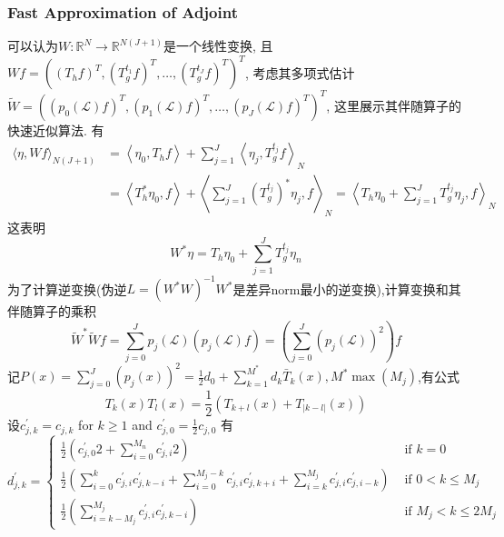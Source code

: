 \documentclass{article}
\begin{document}
\subsubsection{Fast Approximation of Adjoint}

    可以认为$W: \mathbb{R}^{N} \rightarrow \mathbb{R}^{N(J+1)}$是一个线性变换, 且$W f=\left(\left(T_{h} f\right)^{T},\left(T_{g}^{t_{1}} f\right)^{T}, \ldots,\left(T_{g}^{t_{J}} f\right)^{T}\right)^{T}$, 考虑其多项式估计$\tilde W=\left(\left(p_{0}(\mathcal{L}) f\right)^{T},\left(p_{1}(\mathcal{L}) f\right)^{T}, \ldots,\left(p_{J}(\mathcal{L}) f\right)^{T}\right)^{T}$, 这里展示其伴随算子的快速近似算法.
    有
    \begin{equation}
        \begin{aligned}
        \langle\eta, W f\rangle_{N(J+1)} &=\left\langle\eta_{0}, T_{h} f\right\rangle+\sum_{j=1}^{J}\left\langle\eta_{j}, T_{g}^{t_{j}} f\right\rangle_{N} \\
        &=\left\langle T_{h}^{*} \eta_{0}, f\right\rangle+\left\langle\sum_{j=1}^{J}\left(T_{g}^{t_{j}}\right)^{*} \eta_{j}, f\right\rangle_{N}=\left\langle T_{h} \eta_{0}+\sum_{j=1}^{J} T_{g}^{t_{j}} \eta_{j}, f\right\rangle_{N}
        \end{aligned}
    \end{equation}
    这表明
    \begin{equation}
        W^{*} \eta=T_{h} \eta_{0}+\sum_{j=1}^{J} T_{g}^{t_{j}} \eta_{n}
    \end{equation}
    为了计算逆变换(伪逆$L=\left(W^{*} W\right)^{-1} W^{*}$是差异norm最小的逆变换),计算变换和其伴随算子的乘积
    \begin{equation}
        \tilde{W}^{*} \tilde{W} f=\sum_{j=0}^{J} p_{j}(\mathcal{L})\left(p_{j}(\mathcal{L}) f\right)=\left(\sum_{j=0}^{J}\left(p_{j}(\mathcal{L})\right)^{2}\right) f
    \end{equation}
    记$P(x)=\sum_{j=0}^{J}\left(p_{j}(x)\right)^{2}=\frac{1}{2} d_{0}+\sum_{k=1}^{M^{*}} d_{k} \bar{T}_{k}(x), M^{*}\max(M_j)$,有公式
    \begin{equation}
        T_{k}(x) T_{l}(x)=\frac{1}{2}\left(T_{k+l}(x)+T_{|k-l|}(x)\right)
    \end{equation}
    设$c_{j, k}^{\prime}=c_{j, k}$ for $k \geqslant 1$ and $c_{j, 0}^{\prime}=\frac{1}{2} c_{j, 0}$
    有
    \begin{equation}
        d_{j, k}^{\prime}=\left\{\begin{array}{ll}
        \frac{1}{2}\left(c_{j, 0}^{\prime} 2+\sum_{i=0}^{M_{n}} c_{j, i}^{\prime} 2\right) & \text { if } k=0 \\
        \frac{1}{2}\left(\sum_{i=0}^{k} c_{j, i}^{\prime} c_{j, k-i}^{\prime}+\sum_{i=0}^{M_{j}-k} c_{j, i}^{\prime} c_{j, k+i}^{\prime}+\sum_{i=k}^{M_{j}} c_{j, i}^{\prime} c_{j, i-k}^{\prime}\right) & \text { if } 0<k \leqslant M_{j} \\
        \frac{1}{2}\left(\sum_{i=k-M_{j}}^{M_{j}} c_{j, i}^{\prime} c_{j, k-i}^{\prime}\right) & \text { if } M_{j}<k \leqslant 2 M_{j}
        \end{array}\right.
    \end{equation}
\end{document}
